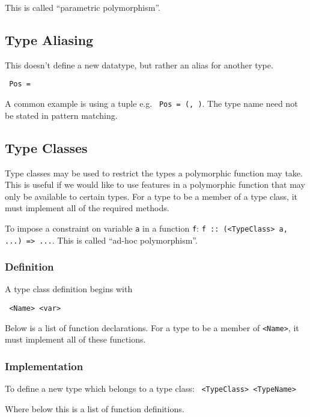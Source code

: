 This is called ``parametric polymorphism''.

\subsection{Type Aliasing}
This doesn't define a new datatype, but rather an alias for another type.
\begin{center}
  \texttt{ Pos = }
\end{center}

A common example is using a tuple e.g. \texttt{ Pos = (, )}. The type name need not be stated in pattern matching.

\subsection{Type Classes}
Type classes may be used to restrict the types a polymorphic function may take. This is useful if we would like to use features in a polymorphic function that may only be available to certain types. For a type to be a member of a type class, it must implement all of the required methods.

To impose a constraint on variable \texttt{a} in a function \texttt{f}: \texttt{f :: (\texttt<TypeClass> a, ...) => ...}. This is called ``ad-hoc polymorphism''.

\subsubsection{Definition}
A type class definition begins with

\texttt{ <Name> <var> }

Below is a list of function declarations. For a type to be a member of \texttt{<Name>}, it must implement all of these functions.

\subsubsection{Implementation}
To define a new type which belongs to a type class:
\texttt{ <TypeClass> <TypeName> }

Where below this is a list of function definitions.

